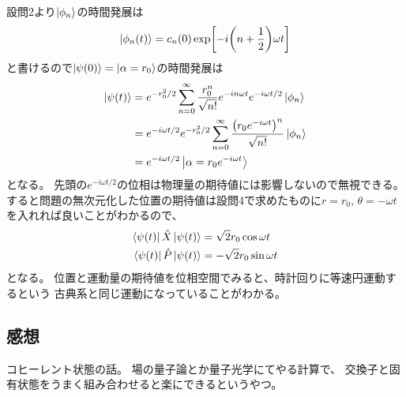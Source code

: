 \documentclass[../../master.tex]{subfiles}
\begin{document}
\subsection{}
設問2より\(\ket{\phi_n}\)の時間発展は
\begin{equation}\begin{aligned}[b]
    \ket{\phi_n(t)} = c_n(0)\exp[-i\qty(n+\frac{1}{2})\omega t]
\end{aligned}\end{equation}
と書けるので\(\ket{\psi(0)}=\ket{\alpha=r_0}\)の時間発展は
\begin{equation}\begin{aligned}[b]
    \ket{\psi(t)}
    &= e^{-r_0^2/2}\sum_{n=0}^{\infty}\frac{r_0^n}{\sqrt{n!}}e^{-in\omega t}e^{-i\omega t/2}\ket{\phi_n}\\
    &= e^{-i\omega t/2}e^{-r_0^2/2}\sum_{n=0}^{\infty}\frac{\qty(r_0e^{-i\omega t})^n}{\sqrt{n!}}\ket{\phi_n}\\
    &= e^{-i\omega t/2}\ket{\alpha=r_0e^{-i\omega t}}
\end{aligned}\end{equation}
となる。
先頭の\(e^{-i\omega t/2}\)の位相は物理量の期待値には影響しないので無視できる。
すると問題の無次元化した位置の期待値は設問4で求めたものに\(r=r_0,\,\theta = -\omega t\)を入れれば良いことがわかるので、
\begin{align}
    \bra{\psi(t)}\hat{X}\ket{\psi(t)} &= \sqrt{2}r_0\cos\omega t\\
    \bra{\psi(t)}\hat{P}\ket{\psi(t)} &= -\sqrt{2}r_0\sin\omega t
\end{align}
となる。
位置と運動量の期待値を位相空間でみると、時計回りに等速円運動するという
古典系と同じ運動になっていることがわかる。

\subsection*{感想}
コヒーレント状態の話。
場の量子論とか量子光学にてやる計算で、
交換子と固有状態をうまく組み合わせると楽にできるというやつ。
\end{document}
